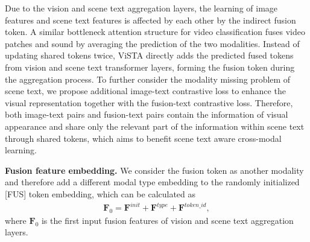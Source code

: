 \documentclass[10pt,twocolumn,letterpaper]{article}
\begin{document}
Due to the vision and scene text aggregation layers, the learning of image features and scene text features is affected by each other by the indirect fusion token. A similar bottleneck attention structure for video classification \cite{bottleneck} fuses video patches and sound by averaging the prediction of the two modalities. Instead of updating shared tokens twice, ViSTA directly adds the predicted fused tokens from vision and scene text transformer layers, forming the fusion token during the aggregation process. To further consider the modality missing problem of scene text, we propose additional image-text contrastive loss to enhance the visual representation together with the fusion-text contrastive loss.
Therefore, both image-text pairs and fusion-text pairs contain the information of visual appearance and share only the relevant part of the information within scene text through shared tokens, which aims to benefit scene text aware cross-modal learning.


\noindent \textbf{Fusion feature embedding.} 
We consider the fusion token as another modality and therefore add a different modal type embedding to the randomly initialized [FUS] token embedding, which can be calculated as
\begin{equation}
\begin{aligned}
\mathbf{F}_0 = \mathbf{F}^{init} + \mathbf{F}^{type} + \mathbf{F}^{token\_id},
\end{aligned}
\end{equation}
where $\mathbf{F}_0$ is the first input fusion features of vision and scene text aggregation layers.



\begin{table}
\centering
\caption{Model settings at various scales.}\vspace{-0.5em}
\label{Tab-setting-model}
\small
{}
\end{table}
\end{document}
